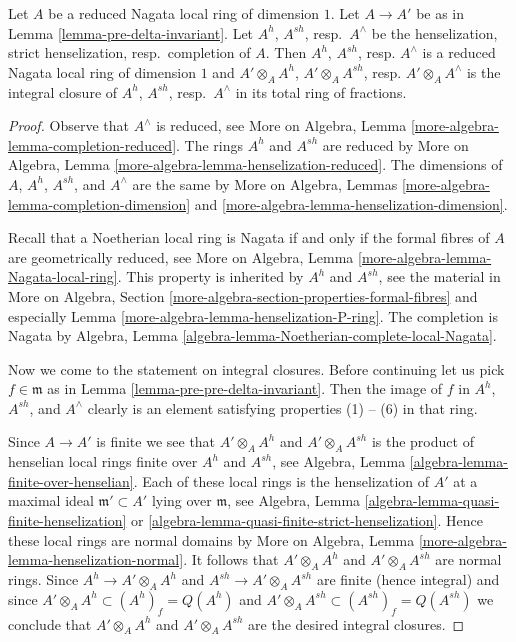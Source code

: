 \begin{lemma}
\label{lemma-normalization-same-after-completion}
Let $A$ be a reduced Nagata local ring of dimension $1$.
Let $A \to A'$ be as in Lemma \ref{lemma-pre-delta-invariant}.
Let $A^h$, $A^{sh}$, resp.\ $A^\wedge$
be the henselization, strict henselization, resp.\ completion of $A$.
Then $A^h$, $A^{sh}$, resp. $A^\wedge$ is a reduced Nagata local
ring of dimension $1$ and
$A' \otimes_A A^h$, $A' \otimes_A A^{sh}$, resp. $A' \otimes_A A^\wedge$
is the integral closure of $A^h$, $A^{sh}$, resp.\ $A^\wedge$
in its total ring of fractions.
\end{lemma}

\begin{proof}
Observe that $A^\wedge$ is reduced, see
More on Algebra, Lemma \ref{more-algebra-lemma-completion-reduced}.
The rings $A^h$ and $A^{sh}$ are reduced by
More on Algebra, Lemma \ref{more-algebra-lemma-henselization-reduced}.
The dimensions of $A$, $A^h$, $A^{sh}$, and $A^\wedge$ are the same
by More on Algebra, Lemmas
\ref{more-algebra-lemma-completion-dimension} and
\ref{more-algebra-lemma-henselization-dimension}.

\medskip\noindent
Recall that a Noetherian local ring is Nagata if and only if the
formal fibres of $A$ are geometrically reduced, see
More on Algebra, Lemma \ref{more-algebra-lemma-Nagata-local-ring}.
This property is inherited by $A^h$ and $A^{sh}$, see
the material in More on Algebra, Section
\ref{more-algebra-section-properties-formal-fibres}
and especially Lemma \ref{more-algebra-lemma-henselization-P-ring}.
The completion is Nagata by
Algebra, Lemma \ref{algebra-lemma-Noetherian-complete-local-Nagata}.

\medskip\noindent
Now we come to the statement on integral closures. Before continuing
let us pick $f \in \mathfrak m$ as in
Lemma \ref{lemma-pre-pre-delta-invariant}.
Then the image of $f$ in $A^h$, $A^{sh}$, and $A^\wedge$
clearly is an element satisfying properties (1) -- (6)
in that ring.

\medskip\noindent
Since $A \to A'$ is finite we see that
$A' \otimes_A A^h$ and $A' \otimes_A A^{sh}$
is the product of henselian local rings finite over $A^h$ and
$A^{sh}$, see Algebra, Lemma \ref{algebra-lemma-finite-over-henselian}.
Each of these local rings is the henselization of $A'$ at a
maximal ideal $\mathfrak m' \subset A'$ lying over $\mathfrak m$, see
Algebra, Lemma \ref{algebra-lemma-quasi-finite-henselization} or
\ref{algebra-lemma-quasi-finite-strict-henselization}.
Hence these local rings are normal domains by
More on Algebra, Lemma \ref{more-algebra-lemma-henselization-normal}.
It follows that $A' \otimes_A A^h$ and $A' \otimes_A A^{sh}$
are normal rings. Since $A^h \to A' \otimes_A A^h$ and
$A^{sh} \to A' \otimes_A A^{sh}$ are finite (hence integral) and since
$A' \otimes_A A^h \subset (A^h)_f = Q(A^h)$ and
$A' \otimes_A A^{sh} \subset (A^{sh})_f = Q(A^{sh})$
we conclude that $A' \otimes_A A^h$ and $A' \otimes_A A^{sh}$ are
the desired integral closures.


\end{proof}

